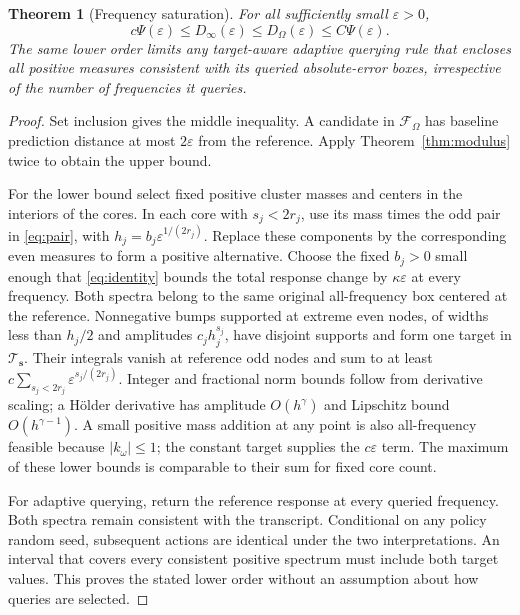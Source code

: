 \documentclass[10pt]{amsart}
\newtheorem{theorem}{Theorem}[section]
\theoremstyle{definition}
\theoremstyle{remark}
\theoremstyle{plain}
\newcommand{\eps}{\varepsilon}
\newcommand{\F}{\mathcal F}
\newcommand{\Tclass}{\mathcal T_{\boldsymbol s}}
\begin{document}
\begin{theorem}[Frequency saturation]\label{thm:saturation}
For all sufficiently small $\eps>0$,
\begin{equation}\label{eq:saturation}
 c\Psi(\eps)\le D_\infty(\eps)\le D_\Omega(\eps)\le C\Psi(\eps).
\end{equation}
The same lower order limits any target-aware adaptive querying rule that encloses all positive measures consistent with its queried absolute-error boxes, irrespective of the number of frequencies it queries.
\end{theorem}
\begin{proof}
Set inclusion gives the middle inequality. A candidate in $\F_\Omega$ has baseline prediction distance at most $2\eps$ from the reference. Apply Theorem~\ref{thm:modulus} twice to obtain the upper bound.

For the lower bound select fixed positive cluster masses and centers in the interiors of the cores. In each core with $s_j<2r_j$, use its mass times the odd pair in \eqref{eq:pair}, with $h_j=b_j\eps^{1/(2r_j)}$. Replace these components by the corresponding even measures to form a positive alternative. Choose the fixed $b_j>0$ small enough that \eqref{eq:identity} bounds the total response change by $\kappa\eps$ at every frequency. Both spectra belong to the same original all-frequency box centered at the reference. Nonnegative bumps supported at extreme even nodes, of widths less than $h_j/2$ and amplitudes $c_jh_j^{s_j}$, have disjoint supports and form one target in $\Tclass$. Their integrals vanish at reference odd nodes and sum to at least $c\sum_{s_j<2r_j}\eps^{s_j/(2r_j)}$. Integer and fractional norm bounds follow from derivative scaling; a H\"older derivative has amplitude $O(h^\gamma)$ and Lipschitz bound $O(h^{\gamma-1})$. A small positive mass addition at any point is also all-frequency feasible because $|k_\omega|\le1$; the constant target supplies the $c\eps$ term. The maximum of these lower bounds is comparable to their sum for fixed core count.

For adaptive querying, return the reference response at every queried frequency. Both spectra remain consistent with the transcript. Conditional on any policy random seed, subsequent actions are identical under the two interpretations. An interval that covers every consistent positive spectrum must include both target values. This proves the stated lower order without an assumption about how queries are selected.
\end{proof}
\end{document}
